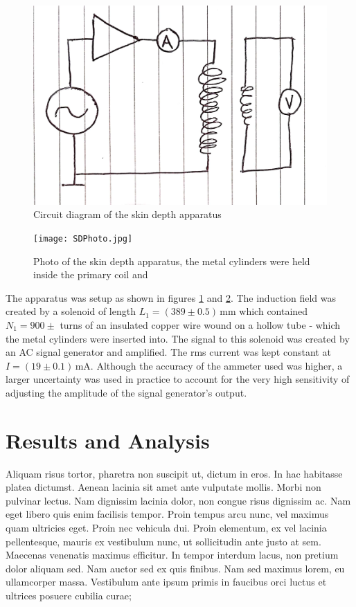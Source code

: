 \documentclass[a4paper,12pt,twocolumn]{article}
\begin{document}
	\begin{figure}
		\centering
		\includegraphics[scale=0.1]{SDcircuit.jpg}
		\captionsetup{font=scriptsize}
		\caption{Circuit diagram of the skin depth apparatus}
		\label{fig:circuit}
	\end{figure}

	\begin{figure}
		\centering
		\texttt{[image: SDPhoto.jpg]}
		\captionsetup{font=scriptsize}
		\caption{Photo of the skin depth apparatus, the metal cylinders were held inside the primary coil and  }
		\label{fig:photo}
	\end{figure}

	The apparatus was setup as shown in figures \ref{fig:circuit} and \ref{fig:photo}. The induction field was created by a solenoid of length $L_1 = (389 \pm 0.5) \,\text{mm}$ which contained $N_1 = 900 \pm $ turns of an insulated copper wire wound on a hollow tube - which the metal cylinders were inserted into. The signal to this solenoid was created by an AC signal generator and amplified. The rms current was kept constant at $I = (19 \pm 0.1)\,\text{mA}$. Although the accuracy of the ammeter used was higher, a larger uncertainty was used in practice to account for the very high sensitivity of adjusting the amplitude of the signal generator's output.
	
\section{Results and Analysis}
	Aliquam risus tortor, pharetra non suscipit ut, dictum in eros. In hac habitasse platea dictumst. Aenean lacinia sit amet ante vulputate mollis. Morbi non pulvinar lectus. Nam dignissim lacinia dolor, non congue risus dignissim ac. Nam eget libero quis enim facilisis tempor. Proin tempus arcu nunc, vel maximus quam ultricies eget. Proin nec vehicula dui. Proin elementum, ex vel lacinia pellentesque, mauris ex vestibulum nunc, ut sollicitudin ante justo at sem. Maecenas venenatis maximus efficitur. In tempor interdum lacus, non pretium dolor aliquam sed. Nam auctor sed ex quis finibus. Nam sed maximus lorem, eu ullamcorper massa. Vestibulum ante ipsum primis in faucibus orci luctus et ultrices posuere cubilia curae;
	
\end{document}
